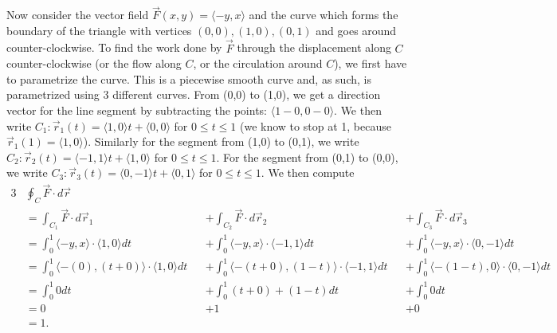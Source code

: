 \begin{example}
%
Now consider the vector field {$\vec
  F(x,y)=\langle-y,x\rangle$} and the curve which forms the boundary of the
triangle with vertices $(0,0), (1,0), (0,1)$ and goes around
counter-clockwise. To find the work done by $\vec F$ through the
displacement along $C$ counter-clockwise (or the flow along $C$, or the circulation
around $C$), we first have to parametrize the curve.  This is a
piecewise smooth curve and, as such, is parametrized using 3 different
curves.  From (0,0) to (1,0), we get a direction vector for the line
segment by subtracting the points: $\langle1-0,0-0\rangle$. We then write
$C_1\colon\vec r_1(t) = \langle1,0\rangle t+\langle0,0\rangle$ for $0\leq t \leq 1$ (we know to stop at
1, because $\vec r_1(1)=\langle1,0\rangle$).  Similarly for the segment from (1,0)
to (0,1), we write $C_2\colon\vec r_2(t) = \langle-1,1\rangle t+\langle1,0\rangle$ for $0\leq t \leq
1$. For the segment from (0,1) to (0,0), we write $C_3\colon\vec r_3(t) =
\langle0,-1\rangle t+\langle0,1\rangle$ for $0\leq t \leq 1$. We then compute
\begin{alignat*}{3}
  &\oint_C \vec F\cdot d\vec r \\
  &= \int_{C_1} \vec F\cdot d\vec r_1 &&+ \int_{C_2} \vec F\cdot d\vec r_2 &&+ \int_{C_3}
  \vec F\cdot d\vec r_3\\
  &= \int_0^1 \langle-y,x\rangle\cdot \langle1,0\rangle dt &&+ \int_0^1
  \langle-y,x\rangle\cdot \langle-1,1\rangle dt &&+ \int_0^1 \langle-y,x\rangle\cdot
  \langle0,-1\rangle dt\\
  &= \int_0^1 \langle-(0),(t+0)\rangle\cdot \langle1,0\rangle dt &&+ \int_0^1
  \langle-(t+0),(1-t)\rangle\cdot \langle-1,1\rangle dt &&+ \int_0^1
  \langle-(1-t),0\rangle\cdot \langle0,-1\rangle dt\\
  &= \int_0^1 0 dt &&+ \int_0^1 (t+0)+(1-t)dt &&+ \int_0^1 0 dt\\
  &= 0 &&+ 1 &&+ 0 \\
  &= 1.
\end{alignat*}
\end{example}


